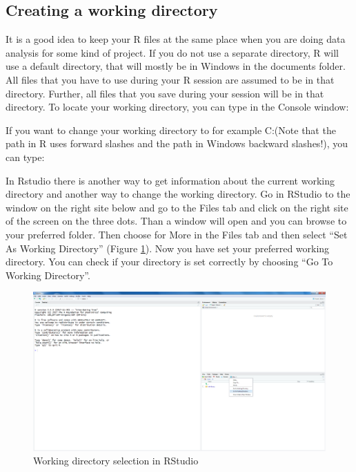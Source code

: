 \documentclass[]{book}
\begin{document}
\subsection{Creating a working
directory}\label{creating-a-working-directory}

It is a good idea to keep your R files at the same place when you are
doing data analysis for some kind of project. If you do not use a
separate directory, R will use a default directory, that will mostly be
in Windows in the documents folder. All files that you have to use
during your R session are assumed to be in that directory. Further, all
files that you save during your session will be in that directory. To
locate your working directory, you can type in the Console window:

If you want to change your working directory to for example
C:\Users\MWHeymans\Documents\R (Note that the path in R uses forward
slashes and the path in Windows backward slashes!), you can type:
 

In Rstudio there is another way to get information about the current
working directory and another way to change the working directory. Go in
RStudio to the window on the right site below and go to the Files tab
and click on the right site of the screen on the three dots. Than a
window will open and you can browse to your preferred folder. Then
choose for More in the Files tab and then select ``Set As Working
Directory'' (Figure \ref{fig:fig12}). Now you have set your preferred
working directory. You can check if your directory is set correctly by
choosing ``Go To Working Directory''.

\begin{figure}

{\centering \includegraphics[width=0.9\linewidth]{images/fig1.12} 

}

\caption{Working directory selection in RStudio}\label{fig:fig12}
\end{figure}
\end{document}
